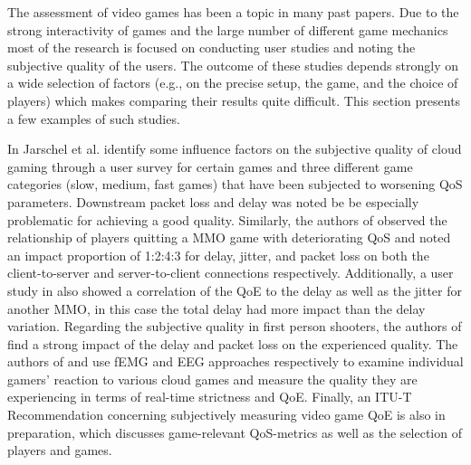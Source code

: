The assessment of video games has been a topic in many past papers. Due to the strong interactivity of games and the large number of different game mechanics most of the research is focused on conducting user studies and noting the subjective quality of the users. The outcome of these studies depends strongly on a wide selection of factors (e.g., on the precise setup, the game, and the choice of players) which makes comparing their results quite difficult. This section presents a few examples of such studies.

In \cite{5976180} Jarschel et al. identify some influence factors on the subjective quality of cloud gaming through a user survey for certain games and three different game categories (slow, medium, fast games) that have been subjected to worsening \gls{QoS} parameters. Downstream packet loss and delay was noted be be especially problematic for achieving a good quality. Similarly, the authors of \cite{4591393} observed the relationship of players quitting a \gls{MMO} game with deteriorating \gls{QoS} and noted an impact proportion of 1:2:4:3 for delay, jitter, and packet loss on both the client-to-server and server-to-client connections respectively. Additionally, a user study in \cite{4604397} also showed a correlation of the \gls{QoE} to the delay as well as the jitter for another \gls{MMO}, in this case the total delay had more impact than the delay variation. Regarding the subjective quality in first person shooters, the authors of \cite{6614351} find a strong impact of the delay and packet loss on the experienced quality. The authors of \cite{6404025} and \cite{beyerusing} use \gls{fEMG} and \gls{EEG} approaches respectively to examine individual gamers' reaction to various cloud games and measure the quality they are experiencing in terms of real-time strictness and \gls{QoE}. Finally, an ITU-T Recommendation \cite{mollertowards} concerning subjectively measuring video game \gls{QoE} is also in preparation, which discusses game-relevant \gls{QoS}-metrics as well as the selection of players and games.

